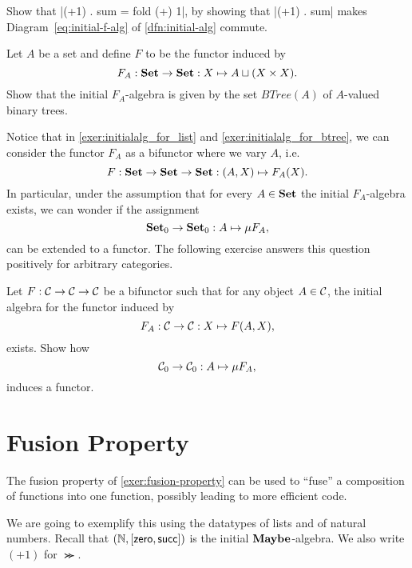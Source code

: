\begin{exer}
  Show that |(+1) . sum = fold (+) 1|, by showing that |(+1) . sum| makes Diagram~\ref{eq:initial-f-alg} of \cref{dfn:initial-alg} commute.
\end{exer}




\begin{exer}\label{exer:initialalg_for_btree} Let $A$ be a set and define $F$ to be the functor induced by 
\[
F_A:\mathbf{Set}\to\mathbf{Set} : X\mapsto A \sqcup (X\times X).
\]
Show that the initial $F_A$-algebra is given by the set $BTree(A)$ of $A$-valued binary trees.
\end{exer}

\begin{rem} Notice that in \cref{exer:initialalg_for_list} and \cref{exer:initialalg_for_btree}, we can consider the functor $F_A$ as a bifunctor where we vary $A$, i.e.
\[
F: \mathbf{Set}\to \mathbf{Set}\to \mathbf{Set}: (A,X)\mapsto F_A(X).
\]
In particular, under the assumption that for every $A\in\mathbf{Set}$ the initial $F_A$-algebra exists, we can wonder if the assignment 
\[
{\mathbf{Set}}_0 \to {\mathbf{Set}}_0 : A\mapsto \mu F_A ,
\]
can be extended to a functor. The following exercise answers this question positively for arbitrary categories.
\end{rem}

\begin{exer}\label{exer:initialalg_for_bifunctor_functor} Let $F:\mathcal{C}\to\mathcal{C}\to\mathcal{C}$ be a bifunctor such that for any object $A\in\mathcal{C}$, the initial algebra for the functor induced by 
\[
F_A : \mathcal{C}\to\mathcal{C} : X\mapsto F(A,X),
\]
exists. Show how
\[
{\mathcal{C}}_0 \to {\mathcal{C}}_0 : A\mapsto \mu F_A ,
\]
induces a functor.
\end{exer}



\section{Fusion Property}\label{sec:fusion}

The fusion property of \cref{exer:fusion-property} can be used to ``fuse'' a composition of functions into one function, possibly leading to more efficient code.

We are going to exemplify this using the datatypes of lists and of natural numbers.
Recall that $(\mathbb{N}, [\mathsf{zero},\mathsf{succ}])$ is the initial $\mathbf{Maybe}$-algebra.
We also write $(+1)$ for $\Succ$.

